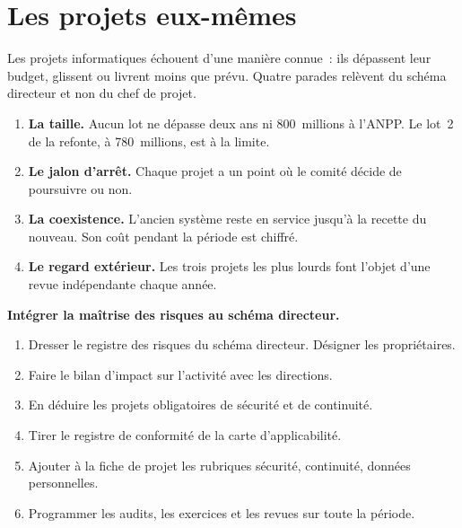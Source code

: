 \section{Les projets eux-mêmes}
\label{sec:c14-projets}

Les projets informatiques échouent d'une manière connue~: ils dépassent leur budget, glissent ou livrent moins
que prévu. Quatre parades relèvent du schéma directeur et non du chef de projet.

\begin{enumerate}
    \item \textbf{La taille.} Aucun lot ne dépasse deux ans ni 800~millions à l'ANPP. Le lot~2 de la refonte,
          à 780~millions, est à la limite.
    \item \textbf{Le jalon d'arrêt.} Chaque projet a un point où le comité décide de poursuivre ou non.
    \item \textbf{La coexistence.} L'ancien système reste en service jusqu'à la recette du nouveau. Son coût
          pendant la période est chiffré.
    \item \textbf{Le regard extérieur.} Les trois projets les plus lourds font l'objet d'une revue
          indépendante chaque année.
\end{enumerate}

\begin{boxprocedure}
\textbf{Intégrer la maîtrise des risques au schéma directeur.}
\begin{enumerate}
    \item Dresser le registre des risques du schéma directeur. Désigner les propriétaires.
    \item Faire le bilan d'impact sur l'activité avec les directions.
    \item En déduire les projets obligatoires de sécurité et de continuité.
    \item Tirer le registre de conformité de la carte d'applicabilité.
    \item Ajouter à la fiche de projet les rubriques sécurité, continuité, données personnelles.
    \item Programmer les audits, les exercices et les revues sur toute la période.
\end{enumerate}
\end{boxprocedure}

